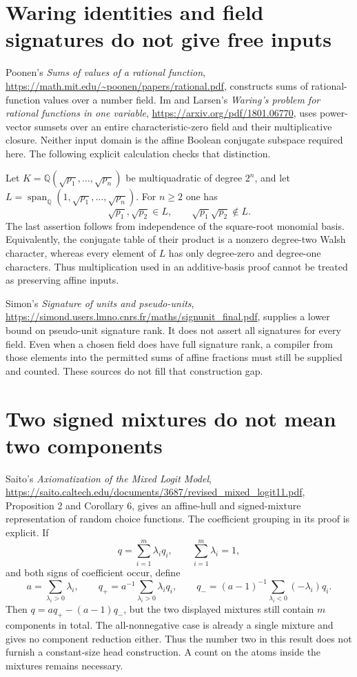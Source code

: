 \documentclass[11pt]{article}
\begin{document}
\section{Waring identities and field signatures do not give free inputs}

Poonen's \emph{Sums of values of a rational function},
\url{https://math.mit.edu/~poonen/papers/rational.pdf}, constructs sums
of rational-function values over a number field. Im and Larsen's
\emph{Waring's problem for rational functions in one variable},
\url{https://arxiv.org/pdf/1801.06770}, uses power-vector sumsets over
an entire characteristic-zero field and their multiplicative closure.
Neither input domain is the affine Boolean conjugate subspace required
here. The following explicit calculation checks that distinction.

Let $K=\mathbb Q(\sqrt{p_1},\ldots,\sqrt{p_n})$ be multiquadratic
of degree $2^n$, and let
$L=\operatorname{span}_{\mathbb Q}(1,\sqrt{p_1},\ldots,\sqrt{p_n})$.
For $n\ge2$ one has
\[
 \sqrt{p_1},\sqrt{p_2}\in L,
 \qquad \sqrt{p_1}\sqrt{p_2}\notin L.
\]
The last assertion follows from independence of the square-root monomial
basis. Equivalently, the conjugate table of their product is a nonzero
degree-two Walsh character, whereas every element of $L$ has only
degree-zero and degree-one characters. Thus multiplication used in an
additive-basis proof cannot be treated as preserving affine inputs.

Simon's \emph{Signature of units and pseudo-units},
\url{https://simond.users.lmno.cnrs.fr/maths/signunit_final.pdf}, supplies
a lower bound on pseudo-unit signature rank. It does not assert all
signatures for every field. Even when a chosen field does have full
signature rank, a compiler from those elements into the permitted sums
of affine fractions must still be supplied and counted. These sources
do not fill that construction gap.


\section{Two signed mixtures do not mean two components}

Saito's \emph{Axiomatization of the Mixed Logit Model},
\url{https://saito.caltech.edu/documents/3687/revised_mixed_logit11.pdf},
Proposition 2 and Corollary 6, gives an affine-hull and signed-mixture
representation of random choice functions. The coefficient grouping in
its proof is explicit. If
\[
 q=\sum_{i=1}^m\lambda_iq_i,\qquad \sum_{i=1}^m\lambda_i=1,
\]
and both signs of coefficient occur, define
\[
 a=\sum_{\lambda_i>0}\lambda_i,\qquad
 q_+=a^{-1}\sum_{\lambda_i>0}\lambda_iq_i,\qquad
 q_-=(a-1)^{-1}\sum_{\lambda_i<0}(-\lambda_i)q_i.
\]
Then $q=aq_+-(a-1)q_-$, but the two displayed mixtures still contain
$m$ components in total. The all-nonnegative case is already a single
mixture and gives no component reduction either. Thus the number two
in this result does not furnish a constant-size head construction.
A count on the atoms inside the mixtures remains necessary.
\end{document}
